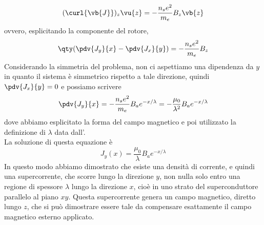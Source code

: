 \begin{equation*}
   (\curl{\vb{J}})_z \vu{z}
   =-\frac{n_s e^2}{m_e} B_z \vb{z}
\end{equation*}
ovvero, esplicitando la componente del rotore,
\begin{equation*}
   \qty( \pdv{J_y}{x} - \pdv{J_x}{y} )
   =-\frac{n_s e^2}{m_e} B_z
\end{equation*}
Considerando la simmetria del problema, non ci aspettiamo una dipendenza da $y$ in quanto il sistema è simmetrico rispetto a tale direzione, quindi $\pdv{J_x}{y}=0$ e possiamo scrivere
\begin{equation*}
   \pdv{J_y}{x}
   =-\frac{n_s e^2}{m_e} B_a e^{-x/\lambda}
   =-\frac{\mu_0}{\lambda^2} B_a e^{-x/\lambda}
\end{equation*}
dove abbiamo esplicitato la forma del campo magnetico e poi utilizzato la definizione di $\lambda$ data dall'.\\
La soluzione di questa equazione è
\begin{equation*}
   J_y(x)
   =\frac{\mu_0}{\lambda} B_a e^{-x/\lambda}
\end{equation*}
In questo modo abbiamo dimostrato che esiste una densità di corrente, e quindi una supercorrente, che scorre lungo la direzione $y$, non nulla solo entro una regione di spessore $\lambda$ lungo la direzione $x$, cioè in uno strato del superconduttore parallelo al piano $xy$. Questa supercorrente genera un campo magnetico, diretto lungo $z$, che si può dimostrare essere tale da compensare esattamente il campo magnetico esterno applicato.
